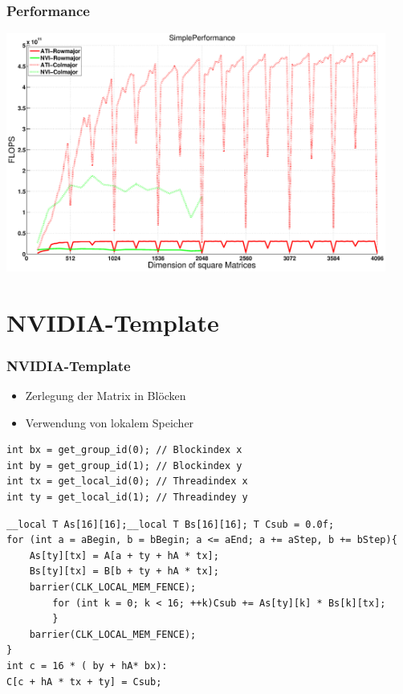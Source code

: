 \documentclass{beamer}
\begin{document}
\begin{frame}
	\frametitle{Performance}
	\begin{center}
		\includegraphics[width=12.5cm]{SimplePerformance}
	\end{center}
	
	
\end{frame}


\section{NVIDIA-Template}
\begin{frame}[fragile]
\frametitle{NVIDIA-Template}

\begin{itemize}
\item
Zerlegung der Matrix in Bl\"ocken
\item
Verwendung von lokalem Speicher 
\end{itemize}

\begin{lstlisting}[style=customc,caption=NVIDIA-Snippet]
int bx = get_group_id(0); // Blockindex x
int by = get_group_id(1); // Blockindex y
int tx = get_local_id(0); // Threadindex x
int ty = get_local_id(1); // Threadindey y
\end{lstlisting}



\end{frame}


\begin{frame}[fragile]
\begin{lstlisting}[style=customc,caption=NVIDIA-Snippet(2)]
__local T As[16][16];__local T Bs[16][16]; T Csub = 0.0f;
for (int a = aBegin, b = bBegin; a <= aEnd; a += aStep, b += bStep){ 
	As[ty][tx] = A[a + ty + hA * tx];
	Bs[ty][tx] = B[b + ty + hA * tx];
	barrier(CLK_LOCAL_MEM_FENCE);
		for (int k = 0; k < 16; ++k)Csub += As[ty][k] * Bs[k][tx];
		}
    barrier(CLK_LOCAL_MEM_FENCE);
}
int c = 16 * ( by + hA* bx):
C[c + hA * tx + ty] = Csub;
\end{lstlisting}


\end{frame}
\end{document}
